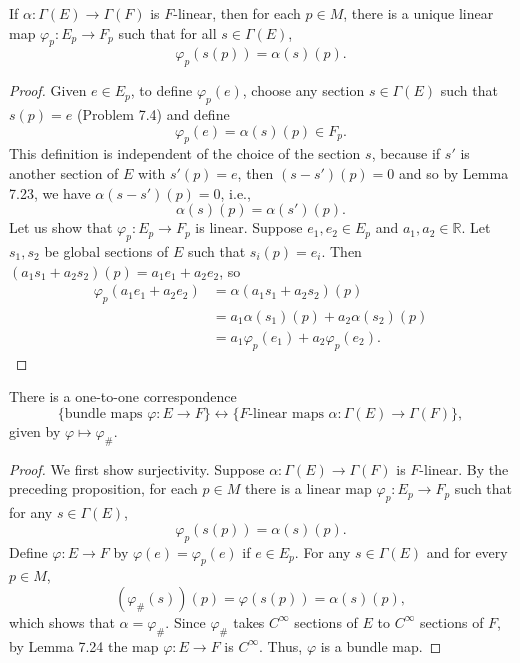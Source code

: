 \begin{example}
\begin{proposition}
If $\alpha : \Gamma(E) \to \Gamma(F)$ is $F$-linear, then for each $p \in M$, there is a unique linear map $\varphi_p : E_p \to F_p$ such that for all $s \in \Gamma(E)$,
\[
\varphi_p(s(p)) = \alpha(s)(p).
\]
\end{proposition}

\begin{proof}
Given $e \in E_p$, to define $\varphi_p(e)$, choose any section $s \in \Gamma(E)$ such that $s(p) = e$ (Problem 7.4) and define
\[
\varphi_p(e) = \alpha(s)(p) \in F_p.
\]
This definition is independent of the choice of the section $s$, because if $s'$ is another section of $E$ with $s'(p) = e$, then $(s - s')(p) = 0$ and so by Lemma 7.23, we have $\alpha(s - s')(p) = 0$, i.e.,
\[
\alpha(s)(p) = \alpha(s')(p).
\]
Let us show that $\varphi_p : E_p \to F_p$ is linear. Suppose $e_1, e_2 \in E_p$ and $a_1, a_2 \in \mathbb{R}$. Let $s_1, s_2$ be global sections of $E$ such that $s_i(p) = e_i$. Then $(a_1 s_1 + a_2 s_2)(p) = a_1 e_1 + a_2 e_2$, so
\begin{align*}
\varphi_p(a_1 e_1 + a_2 e_2) &= \alpha(a_1 s_1 + a_2 s_2)(p) \\
&= a_1 \alpha(s_1)(p) + a_2 \alpha(s_2)(p) \\
&= a_1 \varphi_p(e_1) + a_2 \varphi_p(e_2).
\end{align*}
\end{proof}

\begin{theorem}
There is a one-to-one correspondence
\[
\{\text{bundle maps } \varphi : E \to F\} \longleftrightarrow \{\text{$F$-linear maps } \alpha : \Gamma(E) \to \Gamma(F)\},
\]
given by $\varphi \mapsto \varphi_\#$.
\end{theorem}

\begin{proof}
We first show surjectivity. Suppose $\alpha : \Gamma(E) \to \Gamma(F)$ is $F$-linear. By the preceding proposition, for each $p \in M$ there is a linear map $\varphi_p : E_p \to F_p$ such that for any $s \in \Gamma(E)$,
\[
\varphi_p(s(p)) = \alpha(s)(p).
\]
Define $\varphi : E \to F$ by $\varphi(e) = \varphi_p(e)$ if $e \in E_p$. For any $s \in \Gamma(E)$ and for every $p \in M$,
\[
(\varphi_\#(s))(p) = \varphi(s(p)) = \alpha(s)(p),
\]
which shows that $\alpha = \varphi_\#$. Since $\varphi_\#$ takes $C^{\infty}$ sections of $E$ to $C^{\infty}$ sections of $F$, by Lemma 7.24 the map $\varphi : E \to F$ is $C^{\infty}$. Thus, $\varphi$ is a bundle map.


\end{proof}
\end{example}
